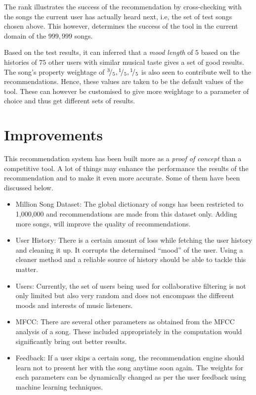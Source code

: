 		The rank illustrates the success of the recommendation by cross-checking with the songs the current user has actually heard next, i.e, the set of test songs chosen above. This however, determines the success of the tool in the current domain of the \(999,999\) songs.
		
		Based on the test results, it can inferred that a \emph{mood length} of \(5\) based on the histories of \(75\) other users with similar musical taste gives a set of good results. The song's property weightage of \({}^{3}\!/_{5}, {}^{1}\!/_{5}, {}^{1}\!/_{5}\) is also seen to contribute well to the recommendations. Hence, these values are taken to be the default values of the tool. These can however be customised to give more weightage to a parameter of choice and thus get different sets of results.
	
	\section{Improvements}
		This recommendation system has been built more as a \emph{proof of concept} than a competitive tool. A lot of things may enhance the performance the results of the recommendation and to make it even more accurate. Some of them have been discussed below.

 \begin{itemize}
 	\item Million Song Dataset: The global dictionary of songs has been restricted to 1,000,000 and recommendations are made from this dataset only. Adding more songs, will improve the quality of recommendations.
 	\item User History: There is a certain amount of loss while fetching the user history and cleaning it up. It corrupts the determined ``mood'' of the user. Using a cleaner method and a reliable source of history should be able to tackle this matter.
 	\item Users: Currently, the set of users being used for collaborative filtering is not only limited but also very random and does not encompass the different moods and interests of music listeners.
 	\item MFCC: There are several other parameters as obtained from the MFCC analysis of a song. These included appropriately in the computation would significantly bring out better results.
 	\item Feedback: If a user skips a certain song, the recommendation engine should learn not to present her with the song anytime soon again. The weights for each parameters can be dynamically changed as per the user feedback using machine learning techniques.
 \end{itemize} 
	
